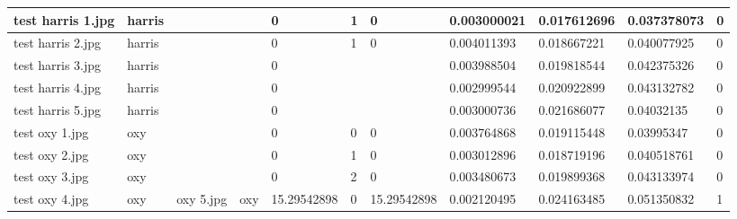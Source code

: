 \begin{landscape}
\begin{longtable}{|p{2cm}|p{1.5cm}|p{2cm}|p{1.5cm}|p{2cm}|p{1cm}|p{2cm}|p{2cm}|p{2cm}|p{2cm}|p{1cm}|}
		test harris 1.jpg    & harris           &                       &                             & 0                     & 1                       & 0                          & 0.003000021           & 0.017612696           & 0.037378073              & 0                \\ \hline
		test harris 2.jpg    & harris           &                       &                             & 0                     & 1                       & 0                          & 0.004011393           & 0.018667221           & 0.040077925              & 0                \\ \hline
		test harris 3.jpg    & harris           &                       &                             & 0                     &                         &                            & 0.003988504           & 0.019818544           & 0.042375326              & 0                \\ \hline
		test harris 4.jpg    & harris           &                       &                             & 0                     &                         &                            & 0.002999544           & 0.020922899           & 0.043132782              & 0                \\ \hline
		test harris 5.jpg    & harris           &                       &                             & 0                     &                         &                            & 0.003000736           & 0.021686077           & 0.04032135               & 0                \\ \hline
		test oxy 1.jpg       & oxy              &                       &                             & 0                     & 0                       & 0                          & 0.003764868           & 0.019115448           & 0.03995347               & 0                \\ \hline
		test oxy 2.jpg       & oxy              &                       &                             & 0                     & 1                       & 0                          & 0.003012896           & 0.018719196           & 0.040518761              & 0                \\ \hline
		test oxy 3.jpg       & oxy              &                       &                             & 0                     & 2                       & 0                          & 0.003480673           & 0.019899368           & 0.043133974              & 0                \\ \hline
		test oxy 4.jpg       & oxy              & oxy 5.jpg             & oxy                         & 15.29542898           & 0                       & 15.29542898                & 0.002120495           & 0.024163485           & 0.051350832              & 1                \\ \hline

\end{longtable}
\end{landscape}
